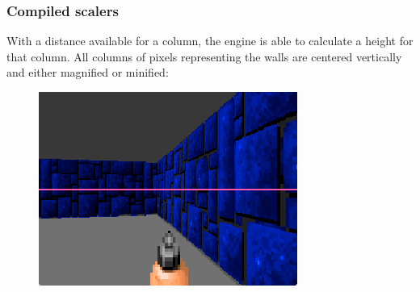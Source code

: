 \subsubsection{Compiled scalers}
With a distance available for a column, the engine is able to calculate a height for that column. All columns of pixels representing the walls are centered vertically and either magnified or minified:\\
\par
 \begin{figure}[H]
\centering
 \includegraphics[width=\textwidth]{imgs/scaler_valign.png}
 \end{figure}
\par

